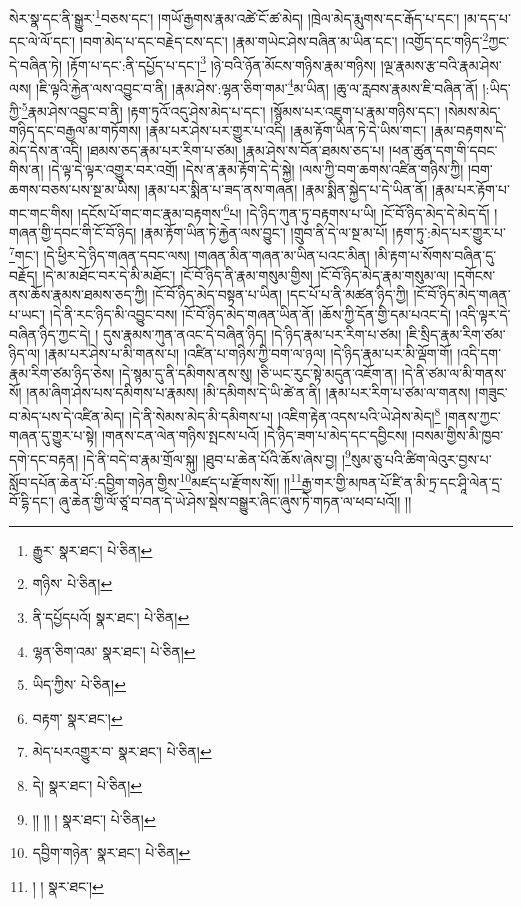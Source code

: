 སེར་སྣ་དང་ནི་སྒྱུར་\footnote{རྒྱུར་  སྣར་ཐང་།  པེ་ཅིན། }བཅས་དང་། །གཡོ་རྒྱགས་རྣམ་འཚེ་ངོ་ཚ་མེད། །ཁྲེལ་མེད་རྨུགས་དང་རྒོད་པ་དང་། །མ་དད་པ་དང་ལེ་ལོ་དང་། །བག་མེད་པ་དང་བརྗེད་ངས་དང་། །རྣམ་གཡེང་ཤེས་བཞིན་མ་ཡིན་དང་། །འགྱོད་དང་གཉིད་\footnote{གཉིས་  པེ་ཅིན། }ཀྱང་དེ་བཞིན་ཏེ། །རྟོག་པ་དང་:ནི་དཔྱོད་པ་དང་།\footnote{ནི་དཔྱོདཔའོ།  སྣར་ཐང་།  པེ་ཅིན། } །ཉེ་བའི་ཉོན་མོངས་གཉིས་རྣམ་གཉིས། །ལྔ་རྣམས་རྩ་བའི་རྣམ་ཤེས་ལས། །ཇི་ལྟའི་རྐྱེན་ལས་འབྱུང་བ་ནི། །རྣམ་ཤེས་:ལྷན་ཅིག་གམ་\footnote{ལྷན་ཅིག་འམ་  སྣར་ཐང་།  པེ་ཅིན། }མ་ཡིན། །ཆུ་ལ་རླབས་རྣམས་ཇི་བཞིན་ནོ། །:ཡིད་ཀྱི་\footnote{ཡིད་ཀྱིས་  པེ་ཅིན། }རྣམ་ཤེས་འབྱུང་བ་ནི། །རྟག་ཏུའོ་འདུ་ཤེས་མེད་པ་དང་། །སྙོམས་པར་འཇུག་པ་རྣམ་གཉིས་དང་། །སེམས་མེད་གཉིད་དང་བརྒྱལ་མ་གཏོགས། །རྣམ་པར་ཤེས་པར་གྱུར་པ་འདི། །རྣམ་རྟོག་ཡིན་ཏེ་དེ་ཡིས་གང་། །རྣམ་བརྟགས་དེ་མེད་དེས་ན་འདི། །ཐམས་ཅད་རྣམ་པར་རིག་པ་ཙམ། །རྣམ་ཤེས་ས་བོན་ཐམས་ཅད་པ། །ཕན་ཚུན་དག་གི་དབང་གིས་ན། །དེ་ལྟ་དེ་ལྟར་འགྱུར་བར་འགྲོ། །དེས་ན་རྣམ་རྟོག་དེ་དེ་སྐྱེ། །ལས་ཀྱི་བག་ཆགས་འཛིན་གཉིས་ཀྱི། །བག་ཆགས་བཅས་པས་སྔ་མ་ཡིས། །རྣམ་པར་སྨིན་པ་ཟད་ནས་གཞན། །རྣམ་སྨིན་སྐྱེད་པ་དེ་ཡིན་ནོ། །རྣམ་པར་རྟོག་པ་གང་གང་གིས། །དངོས་པོ་གང་གང་རྣམ་བརྟགས་\footnote{བརྟག་  སྣར་ཐང་། }པ། །དེ་ཉིད་ཀུན་ཏུ་བརྟགས་པ་ཡི། །ངོ་བོ་ཉིད་མེད་དེ་མེད་དོ། །གཞན་གྱི་དབང་གི་ངོ་བོ་ཉིད། །རྣམ་རྟོག་ཡིན་ཏེ་རྐྱེན་ལས་བྱུང་། །གྲུབ་ནི་དེ་ལ་སྔ་མ་པོ། །རྟག་ཏུ་:མེད་པར་གྱུར་པ་\footnote{མེད་པརའགྱུར་བ་  སྣར་ཐང་།  པེ་ཅིན། }གང་། །དེ་ཕྱིར་དེ་ཉིད་གཞན་དབང་ལས། །གཞན་མིན་གཞན་མ་ཡིན་པའང་མིན། །མི་རྟག་པ་སོགས་བཞིན་དུ་བརྗོད། །དེ་མ་མཐོང་བར་དེ་མི་མཐོང་། །ངོ་བོ་ཉིད་ནི་རྣམ་གསུམ་གྱིས། །ངོ་བོ་ཉིད་མེད་རྣམ་གསུམ་ལ། །དགོངས་ནས་ཆོས་རྣམས་ཐམས་ཅད་ཀྱི། །ངོ་བོ་ཉིད་མེད་བསྟན་པ་ཡིན། །དང་པོ་པ་ནི་མཚན་ཉིད་ཀྱི། །ངོ་བོ་ཉིད་མེད་གཞན་པ་ཡང་། །དེ་ནི་རང་ཉིད་མི་འབྱུང་བས། །ངོ་བོ་ཉིད་མེད་གཞན་ཡིན་ནོ། །ཆོས་ཀྱི་དོན་གྱི་དམ་པའང་དེ། །འདི་ལྟར་དེ་བཞིན་ཉིད་ཀྱང་དེ། །
དུས་རྣམས་ཀུན་ནའང་དེ་བཞིན་ཉིད། །དེ་ཉིད་རྣམ་པར་རིག་པ་ཙམ། །ཇི་སྲིད་རྣམ་རིག་ཙམ་ཉིད་ལ། །རྣམ་པར་ཤེས་པ་མི་གནས་པ། །འཛིན་པ་གཉིས་ཀྱི་བག་ལ་ཉལ། །དེ་ཉིད་རྣམ་པར་མི་ལྡོག་གོ། །འདི་དག་རྣམ་རིག་ཙམ་ཉིད་ཅེས། །དེ་སྙམ་དུ་ནི་དམིགས་ནས་སུ། །ཅི་ཡང་རུང་སྟེ་མདུན་འཇོག་ན། །དེ་ནི་ཙམ་ལ་མི་གནས་སོ། །ནམ་ཞིག་ཤེས་པས་དམིགས་པ་རྣམས། །མི་དམིགས་དེ་ཡི་ཚེ་ན་ནི། །རྣམ་པར་རིག་པ་ཙམ་ལ་གནས། །གཟུང་བ་མེད་པས་དེ་འཛིན་མེད། །དེ་ནི་སེམས་མེད་མི་དམིགས་པ། །འཇིག་རྟེན་འདས་པའི་ཡེ་ཤེས་མེད།\footnote{དེ།  སྣར་ཐང་།  པེ་ཅིན། } །གནས་ཀྱང་གཞན་དུ་གྱུར་པ་སྟེ། །གནས་ངན་ལེན་གཉིས་སྤངས་པའོ། །དེ་ཉིད་ཟག་པ་མེད་དང་དབྱིངས། །བསམ་གྱིས་མི་ཁྱབ་དགེ་དང་བརྟན། །དེ་ནི་བདེ་བ་རྣམ་གྲོལ་སྐུ། །ཐུབ་པ་ཆེན་པོའི་ཆོས་ཞེས་བྱ། །\footnote{།། །། །  སྣར་ཐང་།  པེ་ཅིན། }སུམ་ཅུ་པའི་ཚིག་ལེའུར་བྱས་པ་སློབ་དཔོན་ཆེན་པོ་:དབྱིག་གཉེན་གྱིས་\footnote{དབྱིག་གཉེན་  སྣར་ཐང་།  པེ་ཅིན། }མཛད་པ་རྫོགས་སོ།། །།\footnote{། །  སྣར་ཐང་། }རྒྱ་གར་གྱི་མཁན་པོ་ཛི་ན་མི་ཏྲ་དང་ཤཱི་ལེན་དྲ་བོ་དྷི་དང་། ཞུ་ཆེན་གྱི་ལོ་ཙཱ་བ་བན་དེ་ཡེ་ཤེས་སྡེས་བསྒྱུར་ཞིང་ཞུས་ཏེ་གཏན་ལ་ཕབ་པའོ།། །།